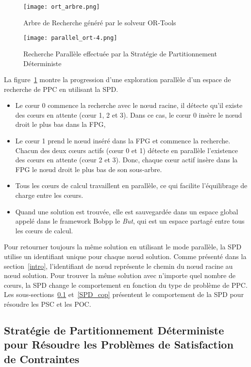 \documentclass[parallelisme]{compas2014}
\begin{document}
\begin{figure}[htbp]
\begin{minipage}[c]{.35\linewidth}
\texttt{[image: ort\_arbre.png]}
\caption {Arbre de Recherche généré par le solveur OR-Tools} \label{ort_arbre}
\end{minipage}
\hfill
\begin{minipage}[c]{.5\linewidth}
\texttt{[image: parallel\_ort-4.png]}
\caption {Recherche Parallèle effectuée par la Stratégie de Partitionnement Déterministe} \label{parallel_SPD}
\end{minipage}
\end{figure}

La figure~\ref{parallel_SPD} montre la progression d'une exploration parallèle d'un espace de recherche de PPC en utilisant la SPD.

\begin{itemize}
\item Le cœur 0 commence la recherche avec le nœud racine, il détecte qu'il existe des cœurs en attente (cœur 1, 2 et 3). Dans ce cas, le cœur 0 insère le nœud droit le plus bas dans la FPG,
\item Le cœur 1 prend le nœud inséré dans la FPG et commence la recherche. Chacun des deux cœurs actifs (cœur 0 et 1) détecte en parallèle l'existence des cœurs en attente (cœur 2 et 3). Donc, chaque cœur actif insère dans la FPG le nœud droit le plus bas de son sous-arbre.
\item Tous les cœurs de calcul travaillent en parallèle, ce qui facilite l'équilibrage de charge entre les cœurs.
\item Quand une solution est trouvée, elle est sauvegardée dans un espace global appelé dans le framework Bobpp le \textit{But}, qui est un espace partagé entre tous les cœurs de calcul.
\end{itemize}

Pour retourner toujours la même solution en utilisant le mode parallèle, la SPD utilise un identifiant unique pour chaque nœud solution. Comme présenté dans la section~\ref{intro}, l'identifiant de nœud représente le chemin du nœud racine au nœud solution. Pour trouver la même solution avec n'importe quel nombre de cœurs, la SPD change le comportement en fonction du type de problème de PPC. Les sous-sections~\ref{SPD_csp} et~\ref{SPD_cop} présentent le comportement de la SPD pour résoudre les PSC et les POC.

\subsection{Stratégie de Partitionnement Déterministe pour Résoudre les Problèmes de Satisfaction de Contraintes}\label{SPD_csp}
\end{document}
